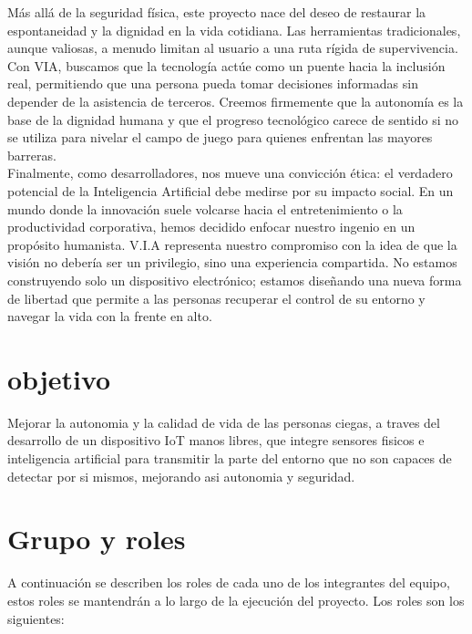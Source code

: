 \documentclass{article}
\begin{document}
Más allá de la seguridad física, este proyecto nace del deseo de restaurar la espontaneidad y la dignidad en la vida cotidiana. Las herramientas tradicionales, aunque valiosas, a menudo limitan al usuario a una ruta rígida de supervivencia. Con VIA, buscamos que la tecnología actúe como un puente hacia la inclusión real, permitiendo que una persona pueda tomar decisiones informadas sin depender de la asistencia de terceros. Creemos firmemente que la autonomía es la base de la dignidad humana y que el progreso tecnológico carece de sentido si no se utiliza para nivelar el campo de juego para quienes enfrentan las mayores barreras. \\

Finalmente, como desarrolladores, nos mueve una convicción ética: el verdadero potencial de la Inteligencia Artificial debe medirse por su impacto social. En un mundo donde la innovación suele volcarse hacia el entretenimiento o la productividad corporativa, hemos decidido enfocar nuestro ingenio en un propósito humanista. V.I.A representa nuestro compromiso con la idea de que la visión no debería ser un privilegio, sino una experiencia compartida. No estamos construyendo solo un dispositivo electrónico; estamos diseñando una nueva forma de libertad que permite a las personas recuperar el control de su entorno y navegar la vida con la frente en alto.


    \newpage
    \section{objetivo}
    Mejorar la autonomia y la calidad de vida de las personas ciegas, a traves del desarrollo de un dispositivo IoT manos libres, que integre sensores fisicos e inteligencia artificial para transmitir la parte del entorno que no son capaces de detectar por si mismos, mejorando asi autonomia y seguridad.

    

    \newpage
    \section{Grupo y roles}
    A continuación se describen los roles de cada uno de los integrantes del equipo, estos roles se mantendrán a lo largo de la ejecución del proyecto. Los roles son los siguientes:
\end{document}
